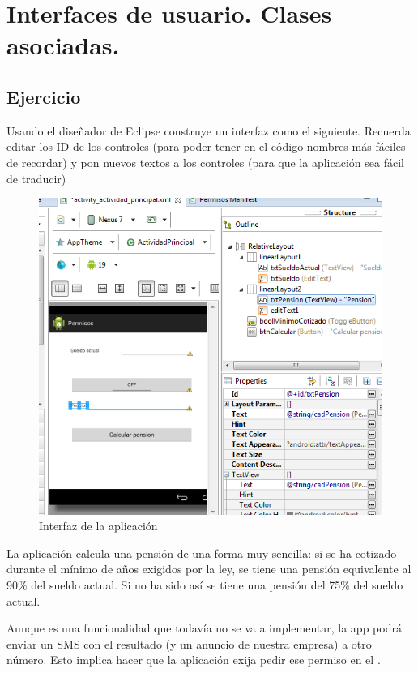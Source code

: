 \documentclass[a4paper,12pt,spanish]{sphinxmanual}
\begin{document}
\section{Interfaces de usuario. Clases asociadas.}
\label{tema2:interfaces-de-usuario-clases-asociadas}

\subsection{Ejercicio}
\label{tema2:ejercicio}
Usando el diseñador de Eclipse construye un interfaz como el siguiente. Recuerda editar los ID de los controles (para poder tener en el código nombres más fáciles de recordar) y pon nuevos textos a los controles (para que la aplicación sea fácil de traducir)
\begin{figure}[htbp]
\centering
\capstart

\includegraphics{appPension.png}
\caption{Interfaz de la aplicación}\end{figure}

La aplicación calcula una pensión de una forma muy sencilla: si se ha cotizado durante el mínimo de años exigidos por la ley, se tiene una pensión equivalente al 90\% del sueldo actual. Si no ha sido así se tiene una pensión del 75\% del sueldo actual.

Aunque es una funcionalidad que todavía no se va a implementar, la app podrá enviar un SMS con el resultado (y un anuncio de nuestra empresa) a otro número. Esto implica hacer que la aplicación exija pedir ese permiso en el .
\end{document}
